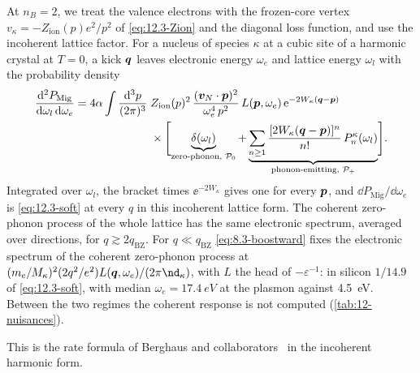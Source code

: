 \begin{keyresult}
At $n_B = 2$, we treat the valence electrons with the frozen-core vertex $v_\kappa = -Z_{\mathrm{ion}}(p)e^2/p^2$ of \cref{eq:12.3-Zion} and the diagonal loss function, and use the incoherent lattice factor. For a nucleus of species $\kappa$ at a cubic site of a harmonic crystal at $T = 0$, a kick $\bm{q}$ leaves electronic energy $\omega_e$ and lattice energy $\omega_l$ with the probability density
\begin{equation}
  \begin{split}
  \frac{\mathrm{d}^2P_{\mathrm{Mig}}}{\mathrm{d}\omega_l\,\mathrm{d}\omega_e} = 4\alpha\int\frac{\mathrm{d}^3p}{(2\pi)^3}\;&Z_{\mathrm{ion}}(p)^2\,\frac{(\bm{v}_N\cdot\bm{p})^2}{\omega_e^4\,p^2}\,L(\bm{p},\omega_e)\,\mathrm{e}^{-2W_\kappa(\bm{q}-\bm{p})} \\
  &\times\Biggl[\underbrace{\delta(\omega_l)}_{\text{zero-phonon, }\mathcal{P}_0} + \underbrace{\sum_{n\ge1}\frac{[2W_\kappa(\bm{q}-\bm{p})]^n}{n!}\,P^\kappa_n(\omega_l)}_{\text{phonon-emitting, }\mathcal{P}_+}\Biggr] .
  \end{split}
  \label{eq:12.4-harm}
\end{equation}
Integrated over $\omega_l$, the bracket times $\ee^{-2W_\kappa}$ gives one for every $\bm{p}$, and $\dd P_{\mathrm{Mig}}/\dd\omega_e$ is \cref{eq:12.3-soft} at every $q$ in this incoherent lattice form. The coherent zero-phonon process of the whole lattice has the same electronic spectrum, averaged over directions, for $q \gtrsim 2q_{\mathrm{BZ}}$. For $q \ll q_{\mathrm{BZ}}$ \cref{eq:8.3-boostward} fixes the electronic spectrum of the coherent zero-phonon process at $(m_e/M_\kappa)^2(2q^2/e^2)L(\vect{q},\omega_e)/(2\pi\nd_\kappa)$, with $L$ the head of $-\varepsilon^{-1}$: in silicon $1/14.9$ of \cref{eq:12.3-soft}, with median $\omega_e = \SI{17.4}{eV}$ at the plasmon against \SI{4.5}{eV}. Between the two regimes the coherent response is not computed (\cref{tab:12-nuisances}).
\end{keyresult}
\noindent This is the rate formula of Berghaus and collaborators~\cite[Eqs.~(3.8), (4.1), (4.5)]{berghaus2023migdal} in the incoherent harmonic form.

